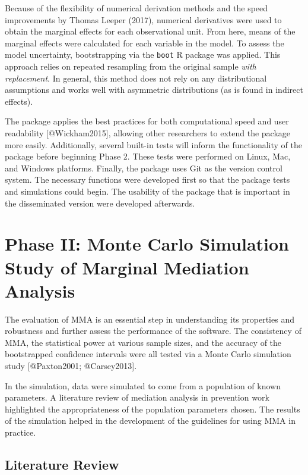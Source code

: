 \documentclass[]{article}
\begin{document}
Because of the flexibility of numerical derivation methods and the speed
improvements by Thomas Leeper (2017), numerical derivatives were used to
obtain the marginal effects for each observational unit. From here,
means of the marginal effects were calculated for each variable in the
model. To assess the model uncertainty, bootstrapping via the
\texttt{boot} R package was applied. This approach relies on repeated
resampling from the original sample \emph{with replacement}. In general,
this method does not rely on any distributional assumptions and works
well with asymmetric distributions (as is found in indirect effects).

The package applies the best practices for both computational speed and
user readability {[}@Wickham2015{]}, allowing other researchers to
extend the package more easily. Additionally, several built-in tests
will inform the functionality of the package before beginning Phase 2.
These tests were performed on Linux, Mac, and Windows platforms.
Finally, the package uses Git as the version control system. The
necessary functions were developed first so that the package tests and
simulations could begin. The usability of the package that is important
in the disseminated version were developed afterwards.

\section{Phase II: Monte Carlo Simulation Study of Marginal Mediation
Analysis}\label{phase-ii-monte-carlo-simulation-study-of-marginal-mediation-analysis}

The evaluation of MMA is an essential step in understanding its
properties and robustness and further assess the performance of the
software. The consistency of MMA, the statistical power at various
sample sizes, and the accuracy of the bootstrapped confidence intervals
were all tested via a Monte Carlo simulation study {[}@Paxton2001;
@Carsey2013{]}.

In the simulation, data were simulated to come from a population of
known parameters. A literature review of mediation analysis in
prevention work highlighted the appropriateness of the population
parameters chosen. The results of the simulation helped in the
development of the guidelines for using MMA in practice.

\subsection{Literature Review}\label{literature-review}
\end{document}
